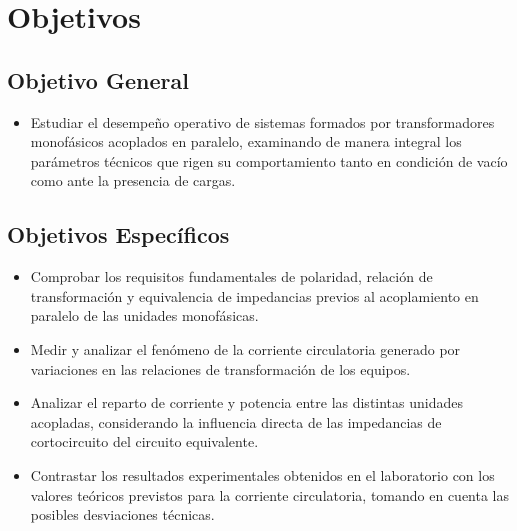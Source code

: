 \section{Objetivos}
\subsection{Objetivo General}

\begin{itemize}
    \item Estudiar el desempeño operativo de sistemas formados por transformadores monofásicos acoplados en paralelo, examinando de manera integral los parámetros técnicos que rigen su comportamiento tanto en condición de vacío como ante la presencia de cargas.
\end{itemize}

\subsection{Objetivos Específicos}

\begin{itemize}
    \item Comprobar los requisitos fundamentales de polaridad, relación de transformación y equivalencia de impedancias previos al acoplamiento en paralelo de las unidades monofásicas.
    
    \item Medir y analizar el fenómeno de la corriente circulatoria generado por variaciones en las relaciones de transformación de los equipos.
    
    \item Analizar el reparto de corriente y potencia entre las distintas unidades acopladas, considerando la influencia directa de las impedancias de cortocircuito del circuito equivalente.
    
    \item Contrastar los resultados experimentales obtenidos en el laboratorio con los valores teóricos previstos para la corriente circulatoria, tomando en cuenta las posibles desviaciones técnicas.
    
\end{itemize}